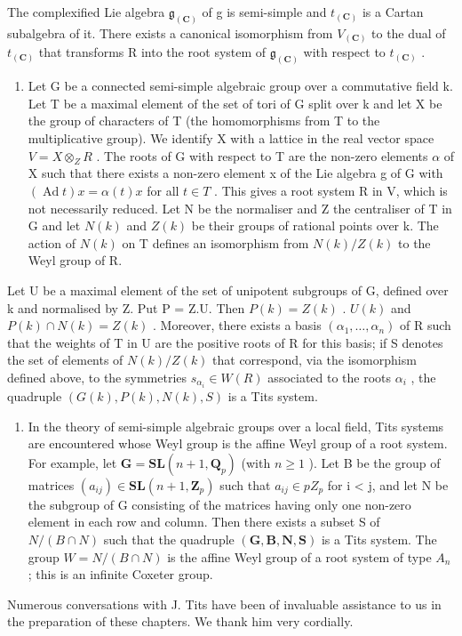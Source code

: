 The complexified Lie algebra \(\mathfrak{g}_{(\mathbf{C})}\) of g is semi-simple and \(t_{(\mathbf{C})}\) is a Cartan subalgebra of it. There exists a canonical isomorphism from \(V_{(\mathbf{C})}\) to the dual of \(t_{(\mathbf{C})}\) that transforms R into the root system of \(\mathfrak{g}_{(\mathbf{C})}\) with respect to \(t_{(\mathbf{C})}\) .

\begin{enumerate}
\def\labelenumi{\Roman{enumi}.}
\setcounter{enumi}{2}
\tightlist
\item
  Let G be a connected semi-simple algebraic group over a commutative field k. Let T be a maximal element of the set of tori of G split over k and let X be the group of characters of T (the homomorphisms from T to the multiplicative group). We identify X with a lattice in the real vector space \(V = X \otimes_{Z} R\) . The roots of G with respect to T are the non-zero elements \(\alpha\) of X such that there exists a non-zero element x of the Lie algebra g of G with \((\operatorname{Ad} t)x = \alpha(t)x\) for all \(t \in T\) . This gives a root system R in V, which is not necessarily reduced. Let N be the normaliser and Z the centraliser of T in G and let \(N(k)\) and \(Z(k)\) be their groups of rational points over k. The action of \(N(k)\) on T defines an isomorphism from \(N(k)/Z(k)\) to the Weyl group of R.
\end{enumerate}

Let U be a maximal element of the set of unipotent subgroups of G, defined over k and normalised by Z. Put P = Z.U. Then \(P(k) = Z(k)\) . \(U(k)\) and \(P(k) \cap N(k) = Z(k)\) . Moreover, there exists a basis \((\alpha_{1}, \ldots, \alpha_{n})\) of R such that the weights of T in U are the positive roots of R for this basis; if S denotes the set of elements of \(N(k)/Z(k)\) that correspond, via the isomorphism defined above, to the symmetries \(s_{\alpha_{i}} \in W(R)\) associated to the roots \(\alpha_{i}\) , the quadruple \((G(k), P(k), N(k), S)\) is a Tits system.

\begin{enumerate}
\def\labelenumi{\Roman{enumi}.}
\setcounter{enumi}{3}
\tightlist
\item
  In the theory of semi-simple algebraic groups over a local field, Tits systems are encountered whose Weyl group is the affine Weyl group of a root system. For example, let \(\mathbf{G} = \mathbf{S}\mathbf{L}(n + 1, \mathbf{Q}_{p})\) (with \(n \geq 1\) ). Let B be the group of matrices \((a_{ij}) \in \mathbf{S}\mathbf{L}(n + 1, \mathbf{Z}_{p})\) such that \(a_{ij} \in pZ_{p}\) for i \textless{} j, and let N be the subgroup of G consisting of the matrices having only one non-zero element in each row and column. Then there exists a subset S of \(N/(B \cap N)\) such that the quadruple \((\mathbf{G}, \mathbf{B}, \mathbf{N}, \mathbf{S})\) is a Tits system. The group \(W = N/(B \cap N)\) is the affine Weyl group of a root system of type \(A_{n}\) ; this is an infinite Coxeter group.
\end{enumerate}

Numerous conversations with J. Tits have been of invaluable assistance to us in the preparation of these chapters. We thank him very cordially.
